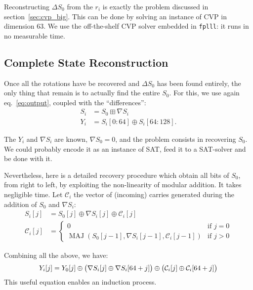\documentclass[submission,svgnames,journal=tosc]{iacrtrans}
\DeclareMathOperator{\MAJ}{MAJ}
\begin{document}
Reconstructing $\Delta S_0$ from the $r_i$ is exactly the problem discussed in
section~\ref{sec:cvp_big}. This can be done by solving an instance of CVP in
dimension $63$. We use the off-the-shelf CVP solver embedded in \texttt{fplll}:
it runs in no measurable time.

\subsection{Complete State Reconstruction}

Once all the rotations have be recovered and $\Delta S_0$ has been found
entirely, the only thing that remain is to actually find the entire $S_0$. For
this, we use again eq.~\eqref{eq:output}, coupled with the ``differences'':
\begin{align*}
  S_i &= S_0 \boxplus \nabla S_i \\
  Y_i &= S_i[0:64] \oplus S_i[64:128].
\end{align*}

The $Y_i$ and $\nabla S_i$ are known, $\nabla S_0 = 0$, and the problem consists
in recovering $S_0$. We could probably encode it as an instance of \textsf{SAT},
feed it to a SAT-solver and be done with it.

Nevertheless, here is a detailed recovery procedure which obtain all bits of
$S_0$, from right to left, by exploiting the non-linearity of modular
addition. It takes negligible time. Let $\mathcal{C}_i$ the vector of (incoming)
carries generated during the addition of $S_0$ and $\nabla S_i$:
\begin{align*}
  S_i[j]           &= S_0[j] \oplus \nabla S_i[j] \oplus \mathcal{C}_i[j]\\
  \mathcal{C}_i[j] &= \begin{cases}
    0 &\text{if } j = 0 \\
    \MAJ(S_0[j-1], \nabla S_i[j-1], \mathcal{C}_i[j-1]) &\text{if } j > 0
  \end{cases}
\end{align*}

Combining all the above, we have:
\begin{equation}\label{eq:master}
  Y_i[j] = Y_0[j] \oplus \bigl( \nabla S_i[j] \oplus \nabla S_i[64+j] \bigr) \oplus \bigl(\mathcal{C}_i[j] \oplus \mathcal{C}_i[64+j]\bigr)\\
\end{equation}
This useful equation enables an induction process.
\end{document}
